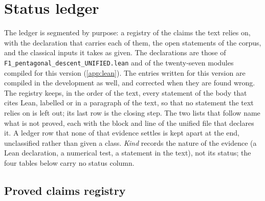 \appendix

\section{Status ledger}\label{app:ledger}

The ledger is segmented by purpose: a registry of the claims the text relies on, with the
declaration that carries each of them, the open statements of the corpus, and the classical
inputs it takes as given.  The declarations are those of
\texttt{F1\_pentagonal\_descent\_UNIFIED.lean} and of the twenty-seven modules compiled for this version
(\cref{app:lean}).
The entries written for this version are compiled in the development as well, and corrected
when they are found wrong.
The registry keeps, in the order of the text, every statement of the body that cites Lean,
labelled or in a paragraph of the text, so that no statement the text relies on is left out;
its last row is the closing step.  The two lists that follow name what is not proved, each
with the block and line of the unified file that declares it.  A ledger row that none of
that evidence settles is kept apart at the end, unclassified rather than given a class.
\emph{Kind} records the nature of the evidence (a Lean declaration, a numerical test, a
statement in the text), not its status; the four tables below carry no status column.

\subsection{Proved claims registry}

